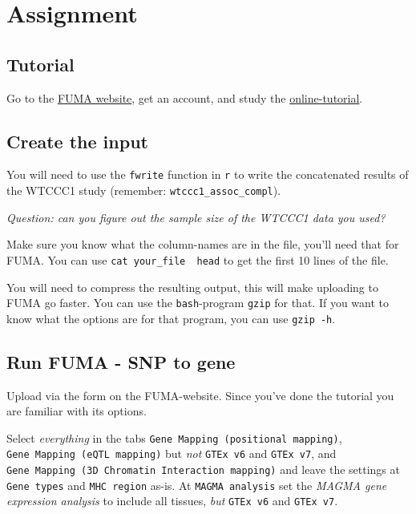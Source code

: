 \documentclass[
]{book}
\begin{document}
\hypertarget{assignment-1}{%
\section{Assignment}\label{assignment-1}}

\hypertarget{tutorial}{%
\subsection{Tutorial}\label{tutorial}}

Go to the \href{https://fuma.ctglab.nl}{FUMA website}, get an account, and study the \href{https://fuma.ctglab.nl/tutorial}{online-tutorial}.

\hypertarget{create-the-input}{%
\subsection{Create the input}\label{create-the-input}}

You will need to use the \texttt{fwrite} function in \texttt{r} to write the concatenated results of the WTCCC1 study (remember: \texttt{wtccc1\_assoc\_compl}).

\emph{Question: can you figure out the sample size of the WTCCC1 data you used?}

Make sure you know what the column-names are in the file, you'll need that for FUMA. You can use \texttt{cat\ your\_file\ \textbar{}\ head} to get the first 10 lines of the file.

You will need to compress the resulting output, this will make uploading to FUMA go faster. You can use the \texttt{bash}-program \texttt{gzip} for that. If you want to know what the options are for that program, you can use \texttt{gzip\ -h}.

\hypertarget{run-fuma---snp-to-gene}{%
\subsection{Run FUMA - SNP to gene}\label{run-fuma---snp-to-gene}}

Upload via the form on the FUMA-website. Since you've done the tutorial you are familiar with its options.

Select \emph{everything} in the tabs \texttt{Gene\ Mapping\ (positional\ mapping)}, \texttt{Gene\ Mapping\ (eQTL\ mapping)} but \emph{not} \texttt{GTEx\ v6} and \texttt{GTEx\ v7}, and \texttt{Gene\ Mapping\ (3D\ Chromatin\ Interaction\ mapping)} and leave the settings at \texttt{Gene\ types} and \texttt{MHC\ region} as-is. At \texttt{MAGMA\ analysis} set the \emph{MAGMA gene expression analysis} to include all tissues, \emph{but} \texttt{GTEx\ v6} and \texttt{GTEx\ v7}.
\end{document}
